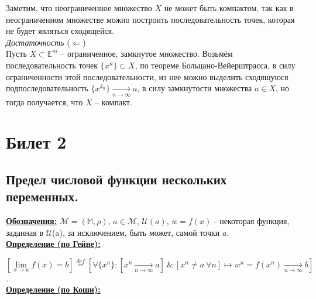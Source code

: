 \documentclass[a4paper,12pt]{article} %
\begin{document}
	Заметим, что неограниченное множество $X$ не может быть компактом, так как в неограниченном множестве можно построить последовательность точек, которая не будет являться сходящейся.\\
	
	\textit{Достаточность} ($\Leftarrow$)\\
	
	Пусть $X \subset \mathbb{E}^m$ -- ограниченное, замкнутое множество. Возьмём последовательность точек $\{x^n \} \subset X$, по теореме Больцано-Вейерштрасса, в силу ограниченности этой последовательности, из нее можно выделить сходящуюся подпоследовательность $\{x^{k_n} \} \xrightarrow[n \to \infty]{} a$, в силу замкнутости множества $a \in X$, но тогда получается, что $X$ -- компакт.
	
	
	
	
	\newpage
	\section{Билет 2}
	
	\subsection{Предел числовой функции нескольких переменных.}
	
	\underline{\textbf{Обозначения:}}
	$\mathscr{M} = (\mathbb{M}, \rho)$, $a \in \mathscr{M}$, $\mathscr{U}(a)$,
	$w = f(x)$ - некоторая функция, заданная в $\mathscr{U}$(a), за исключением, быть может, самой точки $a$.\\
	
	\underline{\textbf{Определение (по Гейне):}}
	
	$[\lim\limits_{x \to a}f(x) = b] \stackrel{def}{=} \left[ \forall \{x^n\}: 
	[x^n \xrightarrow[n \rightarrow \infty]{} a] ~ \& ~ [x^n \neq a ~ \forall n] \mapsto 
	w^n = f(x^n) \xrightarrow[n \rightarrow \infty]{} b\right]$. \\
	
	\underline{\textbf{Определение (по Коши):}}
	
\end{document}
